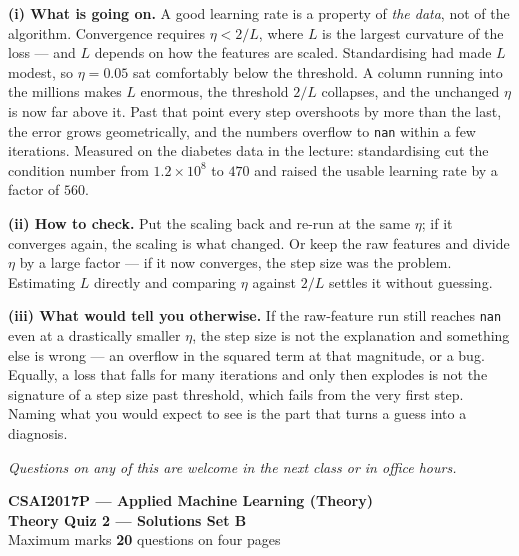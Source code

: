 \documentclass[10pt,a4paper]{article}
\newcommand{\SetLetter}{}
\begin{document}
\vspace{4pt}

\textbf{(i) What is going on.} A good learning rate is a property of \emph{the data}, not of the algorithm. Convergence requires $\eta < 2/L$, where $L$ is the largest curvature of the loss --- and $L$ depends on how the features are scaled. Standardising had made $L$ modest, so $\eta = 0.05$ sat comfortably below the threshold. A column running into the millions makes $L$ enormous, the threshold $2/L$ collapses, and the unchanged $\eta$ is now far above it. Past that point every step overshoots by more than the last, the error grows geometrically, and the numbers overflow to \texttt{nan} within a few iterations. Measured on the diabetes data in the lecture: standardising cut the condition number from $1.2 \times 10^{8}$ to $470$ and raised the usable learning rate by a factor of $560$.\par\vspace{1mm}\textbf{(ii) How to check.} Put the scaling back and re-run at the same $\eta$; if it converges again, the scaling is what changed. Or keep the raw features and divide $\eta$ by a large factor --- if it now converges, the step size was the problem. Estimating $L$ directly and comparing $\eta$ against $2/L$ settles it without guessing.\par\vspace{1mm}\textbf{(iii) What would tell you otherwise.} If the raw-feature run still reaches \texttt{nan} even at a drastically smaller $\eta$, the step size is not the explanation and something else is wrong --- an overflow in the squared term at that magnitude, or a bug. Equally, a loss that falls for many iterations and only then explodes is not the signature of a step size past threshold, which fails from the very first step. Naming what you would expect to see is the part that turns a guess into a diagnosis.

\vfill

{\footnotesize\itshape Questions on any of this are welcome in the next class or in office hours.}

\newpage


\renewcommand{\SetLetter}{B}\setcounter{page}{1}

\begin{center}
{\large\bfseries CSAI2017P --- Applied Machine Learning (Theory)}\\[2pt]
{\large\bfseries Theory Quiz 2 --- Solutions \quad\textbullet\quad Set B}\\[3pt]
{\small Maximum marks \textbf{20} \quad\textbullet{} questions on four pages}
\end{center}
\vspace{2pt}
\end{document}
